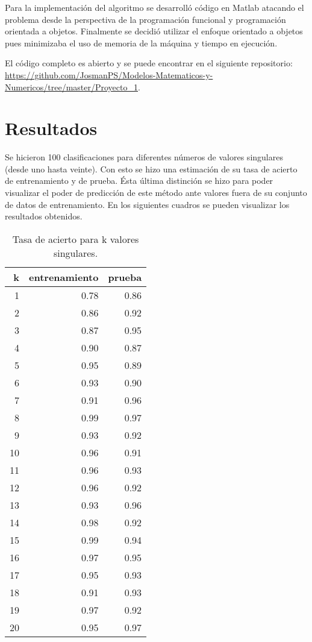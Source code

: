 \documentclass[12pt]{article}
\begin{document}
Para la implementación del algoritmo se desarrolló código en Matlab atacando el problema desde la perspectiva de la programación funcional y programación orientada a objetos. Finalmente se decidió utilizar el enfoque orientado a objetos pues minimizaba el uso de memoria de la máquina y tiempo en ejecución.

El código completo es abierto y se puede encontrar en el siguiente repositorio:\\ \url{https://github.com/JosmanPS/Modelos-Matematicos-y-Numericos/tree/master/Proyecto_1}.



\section{Resultados}

Se hicieron 100 clasificaciones para diferentes números de valores singulares (desde uno hasta veinte). Con esto se hizo una estimación de su tasa de acierto de entrenamiento y de prueba. Ésta última distinción se hizo para poder visualizar el poder de predicción de este método ante valores fuera de su conjunto de datos de entrenamiento. En los siguientes cuadros se pueden visualizar los resultados obtenidos.

\begin{table}[H]
\centering
\begin{tabular}{rrr}
  \hline
 k & entrenamiento & prueba \\ 
  \hline
1 & 0.78 & 0.86 \\ 
  2 & 0.86 & 0.92 \\ 
  3 & 0.87 & 0.95 \\ 
  4 & 0.90 & 0.87 \\ 
  5 & 0.95 & 0.89 \\ 
  6 & 0.93 & 0.90 \\ 
  7 & 0.91 & 0.96 \\ 
  8 & 0.99 & 0.97 \\ 
  9 & 0.93 & 0.92 \\ 
  10 & 0.96 & 0.91 \\ 
  11 & 0.96 & 0.93 \\ 
  12 & 0.96 & 0.92 \\ 
  13 & 0.93 & 0.96 \\ 
  14 & 0.98 & 0.92 \\ 
  15 & 0.99 & 0.94 \\ 
  16 & 0.97 & 0.95 \\ 
  17 & 0.95 & 0.93 \\ 
  18 & 0.91 & 0.93 \\ 
  19 & 0.97 & 0.92 \\ 
  20 & 0.95 & 0.97 \\ 
   \hline
\end{tabular}
\caption{\label{fig:p1}Tasa de acierto para k valores singulares.}
\end{table}
\end{document}
